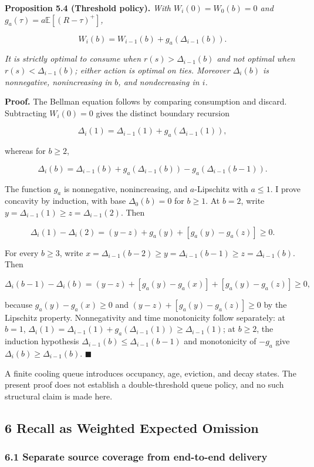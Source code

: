 \documentclass[
  11pt]{article}
\begin{document}
\textbf{Proposition 5.4 (Threshold policy).} \emph{With
\(W_i(0)=W_0(b)=0\) and \(g_a(\tau)=a\mathbb E[(R-\tau)^+]\),}

\[W_i(b)=W_{i-1}(b)+g_a(\Delta_{i-1}(b)).\]

\emph{It is strictly optimal to consume when \(r(s)>\Delta_{i-1}(b)\)
and not optimal when \(r(s)<\Delta_{i-1}(b)\); either action is optimal
on ties. Moreover \(\Delta_i(b)\) is nonnegative, nonincreasing in
\(b\), and nondecreasing in \(i\).}

\textbf{Proof.} The Bellman equation follows by comparing consumption
and discard. Subtracting \(W_i(0)=0\) gives the distinct boundary
recursion

\[\Delta_i(1)=\Delta_{i-1}(1)+g_a(\Delta_{i-1}(1)),\]

whereas for \(b\ge2\),

\[\Delta_i(b)=\Delta_{i-1}(b)+g_a(\Delta_{i-1}(b))-g_a(\Delta_{i-1}(b-1)).\]

The function \(g_a\) is nonnegative, nonincreasing, and \(a\)-Lipschitz
with \(a\le1\). I prove concavity by induction, with base
\(\Delta_0(b)=0\) for \(b\ge1\). At \(b=2\), write
\(y=\Delta_{i-1}(1)\ge z=\Delta_{i-1}(2)\). Then

\[\Delta_i(1)-\Delta_i(2)=(y-z)+g_a(y)+[g_a(y)-g_a(z)]\ge0.\]

For every \(b\ge3\), write
\(x=\Delta_{i-1}(b-2)\ge y=\Delta_{i-1}(b-1)\ge z=\Delta_{i-1}(b)\).
Then

\[\Delta_i(b-1)-\Delta_i(b)=(y-z)+[g_a(y)-g_a(x)]+[g_a(y)-g_a(z)]\ge0,\]

because \(g_a(y)-g_a(x)\ge0\) and \((y-z)+[g_a(y)-g_a(z)]\ge0\) by the
Lipschitz property. Nonnegativity and time monotonicity follow
separately: at \(b=1\),
\(\Delta_i(1)=\Delta_{i-1}(1)+g_a(\Delta_{i-1}(1))\ge\Delta_{i-1}(1)\);
at \(b\ge2\), the induction hypothesis
\(\Delta_{i-1}(b)\le\Delta_{i-1}(b-1)\) and monotonicity of \(-g_a\)
give \(\Delta_i(b)\ge\Delta_{i-1}(b)\). \(\blacksquare\)

A finite cooling queue introduces occupancy, age, eviction, and decay
states. The present proof does not establish a double-threshold queue
policy, and no such structural claim is made here.

\subsection{6 Recall as Weighted Expected
Omission}\label{recall-as-weighted-expected-omission}

\subsubsection{6.1 Separate source coverage from end-to-end
delivery}\label{separate-source-coverage-from-end-to-end-delivery}
\end{document}
